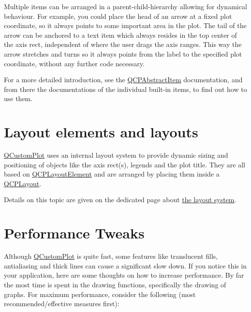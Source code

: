 Multiple items can be arranged in a parent-\/child-\/hierarchy allowing for dynamical behaviour. For example, you could place the head of an arrow at a fixed plot coordinate, so it always points to some important area in the plot. The tail of the arrow can be anchored to a text item which always resides in the top center of the axis rect, independent of where the user drags the axis ranges. This way the arrow stretches and turns so it always points from the label to the specified plot coordinate, without any further code necessary.

For a more detailed introduction, see the \hyperlink{class_q_c_p_abstract_item}{Q\-C\-P\-Abstract\-Item} documentation, and from there the documentations of the individual built-\/in items, to find out how to use them.\hypertarget{index_mainpage-layoutelements}{}\section{Layout elements and layouts}\label{index_mainpage-layoutelements}
\hyperlink{class_q_custom_plot}{Q\-Custom\-Plot} uses an internal layout system to provide dynamic sizing and positioning of objects like the axis rect(s), legends and the plot title. They are all based on \hyperlink{class_q_c_p_layout_element}{Q\-C\-P\-Layout\-Element} and are arranged by placing them inside a \hyperlink{class_q_c_p_layout}{Q\-C\-P\-Layout}.

Details on this topic are given on the dedicated page about \hyperlink{thelayoutsystem}{the layout system}.\hypertarget{index_mainpage-performancetweaks}{}\section{Performance Tweaks}\label{index_mainpage-performancetweaks}
Although \hyperlink{class_q_custom_plot}{Q\-Custom\-Plot} is quite fast, some features like translucent fills, antialiasing and thick lines can cause a significant slow down. If you notice this in your application, here are some thoughts on how to increase performance. By far the most time is spent in the drawing functions, specifically the drawing of graphs. For maximum performance, consider the following (most recommended/effective measures first)\-:

